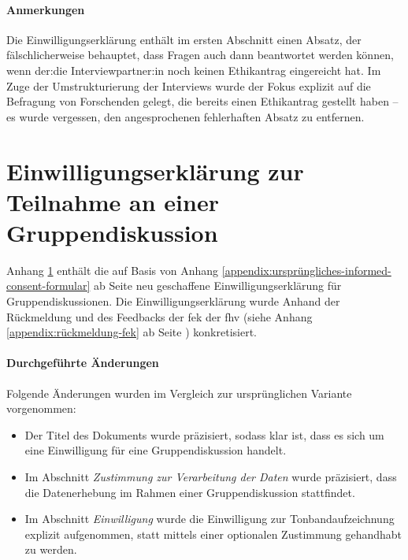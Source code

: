 \documentclass[a4paper,12pt,twoside,numbers=noendperiod]{scrreprt}
\begin{document}
\subsubsection*{Anmerkungen}
\label{appendix:anmerkungen-informed-consent-einzelinterview}

Die Einwilligungserklärung enthält im ersten Abschnitt einen Absatz, der fälschlicherweise behauptet, dass Fragen auch dann beantwortet werden können, wenn der:die Interviewpartner:in noch keinen Ethikantrag eingereicht hat. Im Zuge der Umstrukturierung der Interviews wurde der Fokus explizit auf die Befragung von Forschenden gelegt, die bereits einen Ethikantrag gestellt haben -- es wurde vergessen, den angesprochenen fehlerhaften Absatz zu entfernen.



\cleardoublepage
\chapter{Einwilligungserklärung zur Teilnahme an einer Gruppendiskussion}
\label{appendix:informed-consent-gruppendiskussion}

Anhang \ref{appendix:informed-consent-gruppendiskussion} enthält die auf Basis von Anhang \ref{appendix:ursprüngliches-informed-consent-formular} ab Seite \pageref{appendix:ursprüngliches-informed-consent-formular} neu geschaffene Einwilligungserklärung für Gruppendiskussionen. Die Einwilligungserklärung wurde Anhand der Rückmeldung und des Feedbacks der \acl{fek} der \acl{fhv} (siehe Anhang \ref{appendix:rückmeldung-fek} ab Seite \pageref{appendix:rückmeldung-fek}) konkretisiert.

\subsubsection*{Durchgeführte Änderungen}
\label{appendix:änderungen-informed-consent-gruppendiskussion}

Folgende Änderungen wurden im Vergleich zur ursprünglichen Variante vorgenommen:
\begin{itemize}
    \item Der Titel des Dokuments wurde präzisiert, sodass klar ist, dass es sich um eine Einwilligung für eine Gruppendiskussion handelt.
    \item Im Abschnitt \textit{Zustimmung zur Verarbeitung der Daten} wurde präzisiert, dass die Datenerhebung im Rahmen einer Gruppendiskussion stattfindet.
    \item Im Abschnitt \textit{Einwilligung} wurde die Einwilligung zur Tonbandaufzeichnung explizit aufgenommen, statt mittels einer optionalen Zustimmung gehandhabt zu werden.
\end{itemize}
\end{document}
